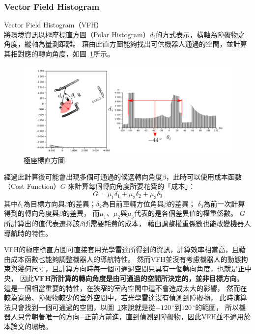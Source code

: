 \subsubsection{Vector Field Histogram}
Vector Field Histogram（VFH）~\cite{Borenstein:1991:VFH}
將環境資訊以極座標直方圖（Polar Histogram）$d_i$的方式表示，橫軸為障礙物之角度，縱軸為量測距離。
藉由此直方圖能夠找出可供機器人通過的空間，並計算其相對應的轉向角度，如圖~\ref{f:vfh}所示。
\begin{figure}[h!]
	\centering
	\includegraphics[width=\textwidth]{figures/algorithm/VFHTotal.png}
	\caption{極座標直方圖}
	\label{f:vfh}
\end{figure}

經過此計算後可能會出現多個可通過的候選轉向角度$\beta$，此時可以使用成本函數（Cost Function）$G$
來計算每個轉向角度所要花費的「成本」：
\begin{equation}
	G = \mu_1 \delta_1 + \mu_2 \delta_2 + \mu_3 \delta_3
\end{equation}
其中$\delta_1$為目標方向與$\beta$的差異；$\delta_2$為目前車輛方位角與$\beta$的差異；
$\delta_3$為前一次計算得到的轉向角度與$\beta$的差異，
而$\mu_1$、$\mu_2$與$\mu_3$代表的是各個差異值的權重係數。
$G$所計算出的值代表選擇該$\beta$所需要耗費的成本，
藉由調整權重係數也能改變機器人導航時的特性。

VFH的極座標直方圖可直接套用光學雷達所得到的資訊，計算效率相當高，且藉由成本函數也能夠調整機器人的導航特性。
然而VFH並沒有考慮機器人的動態拘束與幾何尺寸，且計算方向時每一個可通過空間只具有一個轉向角度，也就是正中央，
因此\textbf{VFH所計算的轉向角度是由可通過的空間所決定的，並非目標方向}。
這是一個相當重要的特性，在狹窄的室內空間中這不會造成太大的影響，
然而在較為寬廣、障礙物較少的室外空間中，若光學雷達沒有偵測到障礙物，
此時演算法只會找到一個可通過的空間，以圖~\ref{f:vfh}來說就是從$-120\,^{\circ}$到$120\,^{\circ}$的範圍，
所以機器人只會朝著唯一的方向─正前方前進，直到偵測到障礙物，因此VFH並不適用於本論文的環境。

